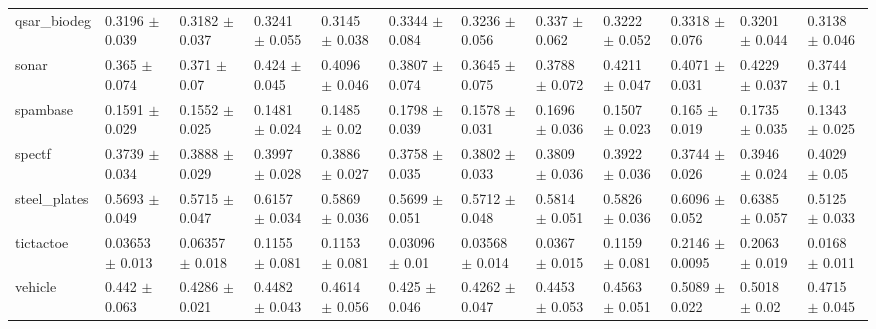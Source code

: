 \begin{tabular}{llllllllllll}
qsar\_biodeg & 0.3196 $\pm$ 0.039 & 0.3182 $\pm$ 0.037 & 0.3241 $\pm$ 0.055 & 0.3145 $\pm$ 0.038 & 0.3344 $\pm$ 0.084 & 0.3236 $\pm$ 0.056 & 0.337 $\pm$ 0.062 & 0.3222 $\pm$ 0.052 & 0.3318 $\pm$ 0.076 & 0.3201 $\pm$ 0.044 & 0.3138 $\pm$ 0.046 \\
sonar & 0.365 $\pm$ 0.074 & 0.371 $\pm$ 0.07 & 0.424 $\pm$ 0.045 & 0.4096 $\pm$ 0.046 & 0.3807 $\pm$ 0.074 & 0.3645 $\pm$ 0.075 & 0.3788 $\pm$ 0.072 & 0.4211 $\pm$ 0.047 & 0.4071 $\pm$ 0.031 & 0.4229 $\pm$ 0.037 & 0.3744 $\pm$ 0.1 \\
spambase & 0.1591 $\pm$ 0.029 & 0.1552 $\pm$ 0.025 & 0.1481 $\pm$ 0.024 & 0.1485 $\pm$ 0.02 & 0.1798 $\pm$ 0.039 & 0.1578 $\pm$ 0.031 & 0.1696 $\pm$ 0.036 & 0.1507 $\pm$ 0.023 & 0.165 $\pm$ 0.019 & 0.1735 $\pm$ 0.035 & 0.1343 $\pm$ 0.025 \\
spectf & 0.3739 $\pm$ 0.034 & 0.3888 $\pm$ 0.029 & 0.3997 $\pm$ 0.028 & 0.3886 $\pm$ 0.027 & 0.3758 $\pm$ 0.035 & 0.3802 $\pm$ 0.033 & 0.3809 $\pm$ 0.036 & 0.3922 $\pm$ 0.036 & 0.3744 $\pm$ 0.026 & 0.3946 $\pm$ 0.024 & 0.4029 $\pm$ 0.05 \\
steel\_plates & 0.5693 $\pm$ 0.049 & 0.5715 $\pm$ 0.047 & 0.6157 $\pm$ 0.034 & 0.5869 $\pm$ 0.036 & 0.5699 $\pm$ 0.051 & 0.5712 $\pm$ 0.048 & 0.5814 $\pm$ 0.051 & 0.5826 $\pm$ 0.036 & 0.6096 $\pm$ 0.052 & 0.6385 $\pm$ 0.057 & 0.5125 $\pm$ 0.033 \\
tictactoe & 0.03653 $\pm$ 0.013 & 0.06357 $\pm$ 0.018 & 0.1155 $\pm$ 0.081 & 0.1153 $\pm$ 0.081 & 0.03096 $\pm$ 0.01 & 0.03568 $\pm$ 0.014 & 0.0367 $\pm$ 0.015 & 0.1159 $\pm$ 0.081 & 0.2146 $\pm$ 0.0095 & 0.2063 $\pm$ 0.019 & 0.0168 $\pm$ 0.011 \\
vehicle & 0.442 $\pm$ 0.063 & 0.4286 $\pm$ 0.021 & 0.4482 $\pm$ 0.043 & 0.4614 $\pm$ 0.056 & 0.425 $\pm$ 0.046 & 0.4262 $\pm$ 0.047 & 0.4453 $\pm$ 0.053 & 0.4563 $\pm$ 0.051 & 0.5089 $\pm$ 0.022 & 0.5018 $\pm$ 0.02 & 0.4715 $\pm$ 0.045 \\
\bottomrule
\end{tabular}
